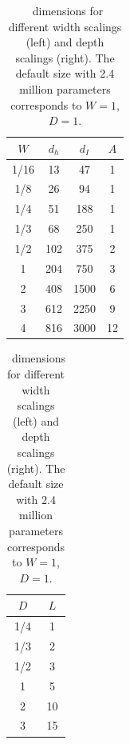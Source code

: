 {{    \begin{table}[h!t]
    \centering
    \begin{tabular}{c|ccc}
    \hline
    $W$ & $d_h$           & $d_I$               & $A$ \\ 
    \hline
    1/16& 13              & 47                  & 1   \\
    1/8 & 26              & 94                  & 1   \\
    1/4 & 51              & 188                 & 1   \\
    1/3 & 68              & 250                 & 1   \\
    1/2 & 102             & 375                 & 2   \\
    1   & 204             & 750                 & 3   \\
    2   & 408             & 1500                & 6   \\
    3   & 612             & 2250                & 9   \\
    4   & 816             & 3000                & 12  \\
    \hline
    \end{tabular}
    \quad \quad \quad \quad
    \begin{tabular}{c|c}
    \hline
    $D$ & $L$ \\
    \hline
    1/4 & 1   \\
    1/3 & 2   \\
    1/2 & 3   \\
    1   & 5   \\
    2   & 10  \\
    3   & 15  \\
    \hline
    \end{tabular}
    \caption{\BERTS~dimensions for different width scalings (left) and depth scalings (right). The default size with 2.4 million parameters corresponds to $W=1$, $D=1$.}
    \label{tab:sizes-bert}
    \end{table}

}}
